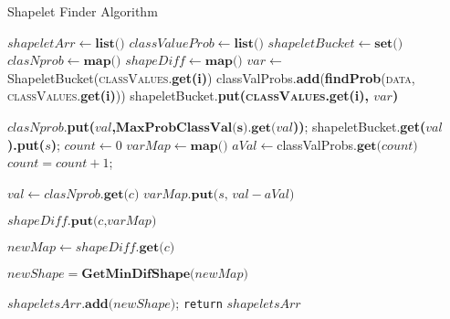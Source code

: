 \documentclass{article}
\begin{document}
\begin{algorithm}
\caption{ Shapelet Finder Algorithm}\label{euclid}

\begin{algorithmic}[1]
\newcommand{\Map}{\textbf{map()}}
\newcommand{\List}{\textbf{list()}}
\newcommand{\Set}{\textbf{set()}}
\State $shapeletArr \gets \List$
\State $classValueProb \gets \List$
\State $shapeletBucket \gets \Set$
\State $clasNprob \gets \Map$
\State $shapeDiff \gets \Map$
	\State $var \gets$ ShapeletBucket(\textsc{classValues}.\textbf {get(i)})
    \State classValProbs.\textbf{add}(\textbf{findProb}(\textsc{data}, \textsc{classValues}.\textbf {get(i)}))
    \State shapeletBucket.\textbf{put(\textsc{classValues}.\textbf {get(i)}, $var$)}
\EndFor

          

	         \State $clasNprob$.\textbf{put($val$,$ \textbf{MaxProbClassVal(s).get($val$}$))};
	         \State shapeletBucket.\textbf{get($val$).put($s$)};
	         \EndFor
\EndFor
\State $count \gets 0$
            \State $varMap \gets \Map $
            \State $aVal \gets $classValProbs$.\textbf{get($count$)}$
            \State $count = count +1$;

                \State $val  \gets clasNprob.\textbf{get($c$)}$
                \State $varMap.\textbf{put($s$, $val - aVal$)}$
            
            \State $shapeDiff.\textbf{put($c$,$varMap$)}$

            \State $newMap \gets shapeDiff.\textbf{get($c$)}$

            \State $newShape = \textbf{GetMinDifShape($newMap$)}$

            \State $shapeletsArr.\textbf{add($newShape$)}$;
            \EndFor
\EndFor
\State \texttt {return} $shapeletsArr$

\EndProcedure
\end{algorithmic}

\end{algorithm}
\end{document}
